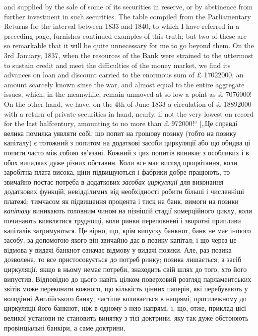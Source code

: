 {and supplied by the sale of some of its securities in reserve, or by abstinence from
further investment in such securities. The table compiled from the Parliamentary
Returns for the interval between 1833 and 1840, to which I have referred in a preceding page,
furnishes continued examples of this truth; but two of these are so
remarkable that it will be quite unnecessary for me to go beyond them. On the
3rd January, 1837, when the resources of the Bank were strained to the uttermost
to sustain credit and meet the difficulties of the money market, we find its advances on loan and
discount carried to the enormous sum of £ \num{17022000}, an
amount scarcely known sinse the war, and almost equal to the entire aggregate
issues, which, in the meanwhile, remain unmoved at so low a point as £ \num{7076000}!
On the other hand, we have, on the 4th of June 1833 a circulation of £ \num{18892000}
with a return of private securities in hand, nearly, if not the very lowest on
record for the last halfcentury, amounting to no more than £ \num{972000}!“ [„Це справді
велика помилка уявляти собі, що попит на грошову позику (тобто на позику
капіталу) є тотожний з попитом на додаткові засоби циркуляції або що обидва
ці попити часто між собою зв’язані. Кожний з цих попитів виникає з особливих і в обох випадках дуже
різних обставин. Коли все має вигляд процвітання, коли заробітна плата висока, ціни підвищуються і
фабрики добре працюють, то звичайно постає потреба в додаткових \emph{засобах циркуляції} для виконання
додаткових функцій, невідділимих від необхідності робити більші і
численніші платежі; тимчасом як підвищення процента і тиск на банк, вимоги
на позики \emph{капіталу} виникають головним чином на пізнішій стадії комерційного циклу, коли починають
виявлятися труднощі, коли ринки переповнені
і зворотні припливи капіталів затримуються. Це вірно, що, крім випуску банкнот,
банк не має іншого засобу, за допомогою якого він звичайно дає в позику
капітал; і що через це відмова у видачі банкнот означає відмову у видачі позики.
Але, раз позика дозволена, то все пристосовується до потреб ринку; позика
лишається, а засіб циркуляції, якщо в ньому немає потреби, знаходить
свій шлях до того, хто його випустив. Відповідно до цього навіть цілком поверховий
розгляд парламентських звітів може переконати кожного, що кількість
цінних паперів, які перебувають у володінні Англійського банку, частіше коливається
в напрямі, протилежному до циркуляції його банкнот, ніж в одному
з нею напрямі, і, що, отже, приклад цієї великої установи не становить винятку
з тієї доктрини, яку так дуже обстоюють провінціальні банкіри, а саме доктрини,
}
